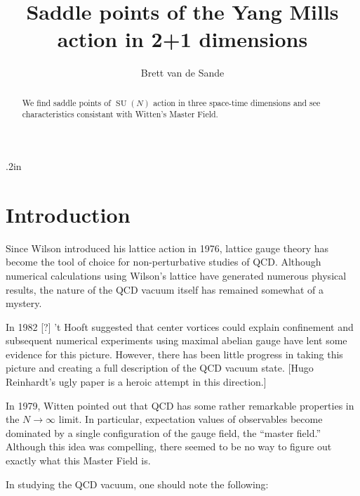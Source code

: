 \documentclass[preprint,aps]{revtex4}
\DeclareMathOperator{\SU}{SU}
\begin{document}
\title{Saddle points of the Yang Mills action in 2+1 dimensions}


\author{Brett van de Sande}


\begin{abstract}
  We find saddle points of $\SU(N)$ action in three space-time dimensions
  and see characteristics consistant with Witten's Master Field.
\end{abstract}

\maketitle

\baselineskip .2in

\section{Introduction}
\label{intro}

Since Wilson introduced his lattice action in 1976,
lattice gauge theory has become the tool of choice for
non-perturbative studies of QCD.  Although numerical
calculations using Wilson's lattice have generated numerous
physical results, the nature of the QCD vacuum itself
has remained somewhat of a mystery.

In 1982 [?] 't Hooft suggested that center vortices could
explain confinement and subsequent numerical experiments
using maximal abelian gauge have lent some evidence for this
picture.  However, there has been little progress in taking
this picture and creating a full description of the
QCD vacuum state.  [Hugo Reinhardt's ugly paper is a
  heroic attempt in this direction.]

In 1979, Witten pointed out that QCD has some rather remarkable
properties in the $N \to \infty$ limit.  In particular,
expectation values of observables become dominated by a single
configuration of the gauge field, the ``master field.''
Although this idea was compelling, there seemed to be no
way to figure out exactly what this Master Field is.

In studying the QCD vacuum, one should note the following:
\end{document}
